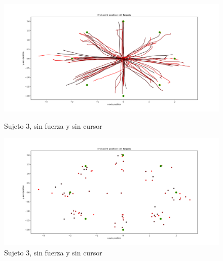 \documentclass[a4paper,11pt, oneside]{book}
\begin{document}
\begin{figure}[H]
	\begin{minipage}[b]{0.5\linewidth}
		\centering
		\includegraphics[width=\linewidth]{sujeto3/no_force_no_cursor/trayectorias}
		\caption{Sujeto 3, sin fuerza y sin cursor}
		\label{3-fase3-1}
	\end{minipage}
	\hspace{0.5cm}
	\begin{minipage}[b]{0.5\linewidth}
		\centering
		\includegraphics[width=\linewidth]{sujeto3/no_force_no_cursor/trayectorias_puntos}
		\caption{Sujeto 3, sin fuerza y sin cursor}
		\label{3-fase3-2}
	\end{minipage}
\end{figure}
\end{document}
